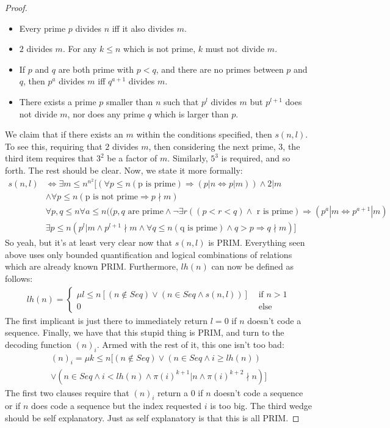 \begin{proof}
\begin{itemize}
        \item Every prime $p$ divides $n$ iff it also divides $m$.
        \item $2$ divides $m$. For any $k \leq n$ which is not prime, $k$ must not divide $m$.
        \item If $p$ and $q$ are both prime with $p < q$, and there are no primes between $p$ and $q$, then $p^a$ divides $m$ iff $q^{a+1}$ divides $m$. 
        \item There exists a prime $p$ smaller than $n$ such that $p^l$ divides $m$ but $p^{l+1}$ does not divide $m$, nor does any prime $q$ which is larger than $p$.
    \end{itemize}
    We claim that if there exists an $m$ within the conditions specified, then $s(n,l)$. To see this, requiring that $2$ divides $m$, then considering the next prime, $3$, the third item requires that $3^2$ be a factor of $m$. Similarly, $5^3$ is required, and so forth. The rest should be clear. Now, we state it more formally:
    \begin{align*}
         s(n,l) & \iff \exists m \leq n^{n^2} [(\forall p \leq n (\textrm{p is prime}) \Rightarrow (p|n \iff p|m)) \wedge 2|m \\ & \wedge \forall p \leq n (\textrm{p is not prime} \Rightarrow p \nmid m) \\ & \forall p,q \leq n \forall a \leq n ((\textrm{$p,q$ are prime} \wedge \neg \exists r ((p < r < q) \wedge \textrm{ r is prime}) \Rightarrow (p^a|m \iff p^{a+1}|m) \\ & \exists p \leq n (p^l|m \wedge p^{l+1}\nmid m \wedge \forall q \leq n (\textrm{q is prime}) \wedge q > p \Rightarrow q \nmid m)] 
    \end{align*} 
    So yeah, but it's at least very clear now that $s(n,l)$ is PRIM. Everything seen above uses only bounded quantification and logical combinations of relations which are already known PRIM. Furthermore, $lh(n)$ can now be defined as follows:
    \begin{align}
        lh(n) = \begin{cases}
                   \mu l \leq n[(n \notin Seq) \vee (n \in Seq \wedge s(n,l))] & \textrm{ if $n > 1$} \\
                   0 & \textrm{ else}
                \end{cases}
    \end{align}
    The first implicant is just there to immediately return $l = 0$ if $n$ doesn't code a sequence. Finally, we have that this stupid thing is PRIM, and turn to the decoding function $(n)_i$. Armed with the rest of it, this one isn't too bad:
    \begin{align}
        (n)_i = \mu k \leq n [(n \notin Seq) \vee (n \in Seq \wedge i \geq lh(n)) \\ \vee (n \in Seq \wedge i < lh(n) \wedge \pi(i)^{k+1}|n \wedge \pi(i)^{k+2}\nmid n)]
    \end{align}
    The first two clauses require that $(n)_i$ return a $0$ if $n$ doesn't code a sequence or if $n$ does code a sequence but the index requested $i$ is too big. The third wedge should be self explanatory. Just as self explanatory is that this is all PRIM. 
\end{proof}

